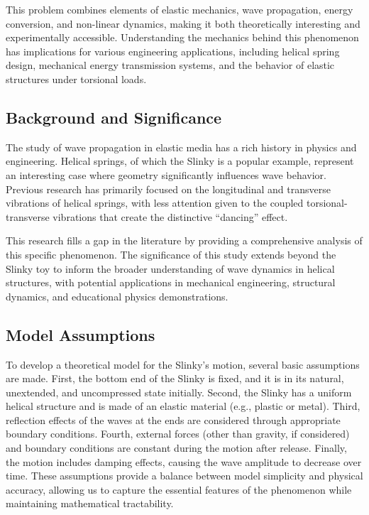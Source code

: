 \documentclass{mcmthesis}  %
\begin{document}
This problem combines elements of elastic mechanics, wave propagation, energy conversion, and non-linear dynamics, making it both theoretically interesting and experimentally accessible. Understanding the mechanics behind this phenomenon has implications for various engineering applications, including helical spring design, mechanical energy transmission systems, and the behavior of elastic structures under torsional loads.

\subsection{Background and Significance}  %
The study of wave propagation in elastic media has a rich history in physics and engineering. Helical springs, of which the Slinky is a popular example, represent an interesting case where geometry significantly influences wave behavior. Previous research has primarily focused on the longitudinal and transverse vibrations of helical springs, with less attention given to the coupled torsional-transverse vibrations that create the distinctive ``dancing'' effect.

This research fills a gap in the literature by providing a comprehensive analysis of this specific phenomenon. The significance of this study extends beyond the Slinky toy to inform the broader understanding of wave dynamics in helical structures, with potential applications in mechanical engineering, structural dynamics, and educational physics demonstrations.

\subsection{Model Assumptions}  %
To develop a theoretical model for the Slinky's motion, several basic assumptions are made. First, the bottom end of the Slinky is fixed, and it is in its natural, unextended, and uncompressed state initially. Second, the Slinky has a uniform helical structure and is made of an elastic material (e.g., plastic or metal). Third, reflection effects of the waves at the ends are considered through appropriate boundary conditions. Fourth, external forces (other than gravity, if considered) and boundary conditions are constant during the motion after release. Finally, the motion includes damping effects, causing the wave amplitude to decrease over time. These assumptions provide a balance between model simplicity and physical accuracy, allowing us to capture the essential features of the phenomenon while maintaining mathematical tractability.
\end{document}
